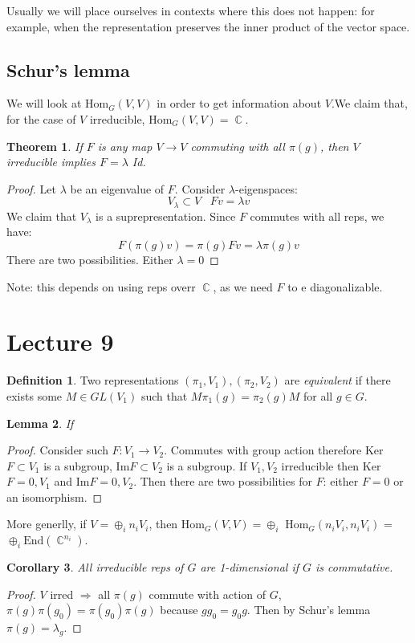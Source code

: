 \documentclass[12 pt]{article}
\DeclareMathOperator {\C} {\mathbb{C}}
\theoremstyle{plain}
\newtheorem{thm}{Theorem}
\newtheorem{lem}[thm]{Lemma}
\newtheorem{cor}[thm]{Corollary}
\theoremstyle{definition}
\newtheorem{defn}{Definition}
\theoremstyle{remark}
\begin{document}
Usually we will place ourselves in contexts where this does not happen: for example, when the representation preserves the inner product of the vector space.

\subsection*{Schur's lemma}
We will look at Hom$_G (V,V)$ in order to get information about $V$.We claim that, for the case of $V$ irreducible, Hom$_G (V,V) = \C$.

\begin{thm}
If $F$ is any map $V\to V$ commuting with all $\pi(g)$, then $V$ irreducible implies $F = \lambda$ Id.
\end{thm}

\begin{proof}
Let $\lambda$ be an eigenvalue of $F$. Consider $\lambda$-eigenspaces:
\[      V_{\lambda} \subset V \;\;\; Fv = \lambda v     \]
We claim that $V_{\lambda}$ is a suprepresentation. Since $F$ commutes with all reps, we have:
\[        F ( \pi(g) v) = \pi(g) F v = \lambda \pi(g) v       \]
There are two possibilities. Either $\lambda = 0$
\end{proof}
Note: this depends on using reps overr $\C$, as we need $F$ to e diagonalizable.


\section*{Lecture 9}

\begin{defn}
Two representations $(\pi_1, V_1), (\pi_2, V_2)$ are \emph{equivalent} if there exists some $M\in GL(V_1)$ such that $M\pi_1(g) = \pi_2(g)M$ for all $g\in G$.
\end{defn}

\begin{lem}
If
\end{lem}
\begin{proof}
Consider such $F: V_1 \to V_2$. Commutes with group action therefore Ker$F \subset V_1$ is a subgroup, Im$F \subset V_2$ is a subgroup. If $V_1, V_2$ irreducible then Ker$F = 0, V_1$ and Im$F = 0, V_2$. Then there are two possibilities for $F$: either $F=0$ or an isomorphism.
\end{proof}
More generlly, if $V = \oplus_i n_i V_i$, then Hom$_G (V, V) = \oplus_i$ Hom$_G (n_i V_i , n_i V_i)$ = $\oplus_i \text{End}(\C^{n_i})$.

\begin{cor}
All irreducible reps of $G$ are 1-dimensional if $G$ is commutative.
\end{cor}
\begin{proof}
$V$ irred $\Rightarrow$ all $\pi(g)$ commute with action of $G$, $\pi(g) \pi(g_0) = \pi(g_0) \pi(g)$ because $gg_0 = g_0g$. Then by Schur's lemma $\pi(g) = \lambda_g$.
\end{proof}
\end{document}
